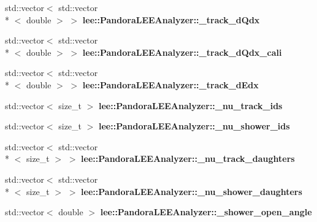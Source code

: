 \begin{DoxyCompactItemize}
\item 
\hypertarget{group__lee_gab54b1be84b3a383b57e5b1c76b480d6b}{std\-::vector$<$ std\-::vector\\*
$<$ double $>$ $>$ {\bfseries lee\-::\-Pandora\-L\-E\-E\-Analyzer\-::\-\_\-track\-\_\-d\-Qdx}}\label{group__lee_gab54b1be84b3a383b57e5b1c76b480d6b}

\item 
\hypertarget{group__lee_gadcd255a2c652d64e4694c6b650839f43}{std\-::vector$<$ std\-::vector\\*
$<$ double $>$ $>$ {\bfseries lee\-::\-Pandora\-L\-E\-E\-Analyzer\-::\-\_\-track\-\_\-d\-Qdx\-\_\-cali}}\label{group__lee_gadcd255a2c652d64e4694c6b650839f43}

\item 
\hypertarget{group__lee_ga81034997677b254a8fa7fb9c090fa756}{std\-::vector$<$ std\-::vector\\*
$<$ double $>$ $>$ {\bfseries lee\-::\-Pandora\-L\-E\-E\-Analyzer\-::\-\_\-track\-\_\-d\-Edx}}\label{group__lee_ga81034997677b254a8fa7fb9c090fa756}

\item 
\hypertarget{group__lee_ga5253913419cf4211211558082106bd62}{std\-::vector$<$ size\-\_\-t $>$ {\bfseries lee\-::\-Pandora\-L\-E\-E\-Analyzer\-::\-\_\-nu\-\_\-track\-\_\-ids}}\label{group__lee_ga5253913419cf4211211558082106bd62}

\item 
\hypertarget{group__lee_ga063d4fec5b4b40b812147b1b77be79a3}{std\-::vector$<$ size\-\_\-t $>$ {\bfseries lee\-::\-Pandora\-L\-E\-E\-Analyzer\-::\-\_\-nu\-\_\-shower\-\_\-ids}}\label{group__lee_ga063d4fec5b4b40b812147b1b77be79a3}

\item 
\hypertarget{group__lee_gacb2657deb7fca8bcf8c97952d7a012cf}{std\-::vector$<$ std\-::vector\\*
$<$ size\-\_\-t $>$ $>$ {\bfseries lee\-::\-Pandora\-L\-E\-E\-Analyzer\-::\-\_\-nu\-\_\-track\-\_\-daughters}}\label{group__lee_gacb2657deb7fca8bcf8c97952d7a012cf}

\item 
\hypertarget{group__lee_ga4d78972623fa65077421a091e226f61f}{std\-::vector$<$ std\-::vector\\*
$<$ size\-\_\-t $>$ $>$ {\bfseries lee\-::\-Pandora\-L\-E\-E\-Analyzer\-::\-\_\-nu\-\_\-shower\-\_\-daughters}}\label{group__lee_ga4d78972623fa65077421a091e226f61f}

\item 
\hypertarget{group__lee_ga9e637e1f18334830d94136b89c4d0138}{std\-::vector$<$ double $>$ {\bfseries lee\-::\-Pandora\-L\-E\-E\-Analyzer\-::\-\_\-shower\-\_\-open\-\_\-angle}}\label{group__lee_ga9e637e1f18334830d94136b89c4d0138}


\end{DoxyCompactItemize}
